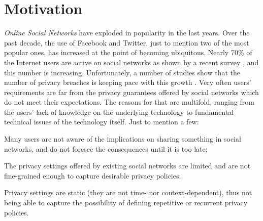 \vspace{-2mm}
\section{Motivation}
\label{sec:motivation}

{\em Online Social Networks} have exploded in popularity in the last years.
Over the past decade, the use of Facebook and Twitter, just to mention two of the most popular ones, has increased at the point of becoming ubiquitous.
Nearly 70\% of the Internet users are active on social networks as shown by a recent survey \cite{SNSuse}, and this number is increasing.
Unfortunately, a number of studies show that the number of privacy breaches is keeping pace with this growth \cite{MJB12spse+,JEM12fpc,YKBA11afps+,MJB11fosn+}.
Very often users' requirements are far from the privacy guarantees offered by social networks  which do not meet their expectations. The reasons for that are multifold, ranging from the users' lack of knowledge on the underlying technology to fundamental technical issues of the technology itself. Just to mention a few:
\begin{inparaenum}[i)]
\item Many users are not aware of the implications on sharing something in social networks, and do not foresee the consequences until it is too late;
\item The privacy settings offered by existing social networks are limited and are not fine-grained enough to capture desirable privacy policies;
\item Privacy settings are static (they are not time- nor context-dependent), thus not being able to capture the possibility of defining repetitive or recurrent privacy policies.
\end{inparaenum}

